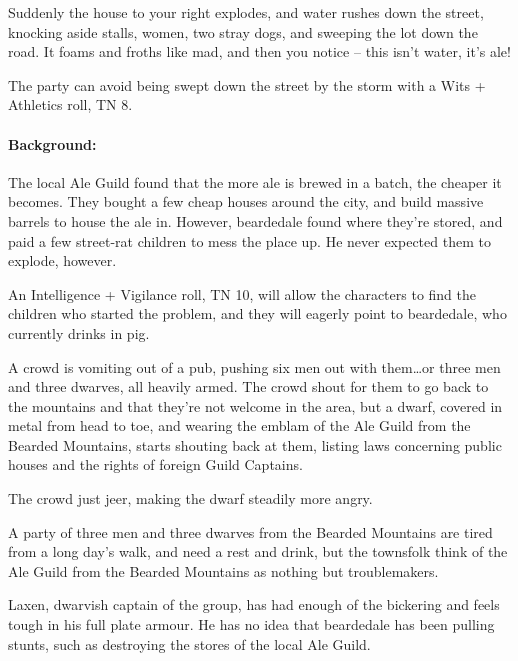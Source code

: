 \begin{multicols}{2}
\begin{boxtext}
	Suddenly the house to your right explodes, and water rushes down the street, knocking aside stalls, women, two stray dogs, and sweeping the lot down the road.  It foams and froths like mad, and then you notice -- this isn't water, it's ale!
\end{boxtext}

The party can avoid being swept down the street by the storm with a Wits + Athletics roll, TN 8.

\paragraph{Background:} The local Ale Guild found that the more ale is brewed in a batch, the cheaper it becomes.  They bought a few cheap houses around the city, and build massive barrels to house the ale in.  However, \gls{beardedale} found where they're stored, and paid a few street-rat children to mess the place up.  He never expected them to explode, however.

An Intelligence + Vigilance roll, TN 10, will allow the characters to find the children who started the problem, and they will eagerly point to \gls{beardedale}, who currently drinks in \gls{pig}.



\begin{boxtext}
	A crowd is vomiting out of a pub, pushing six men out with them\ldots or three men and three dwarves, all heavily armed.  The crowd shout for them to go back to the mountains and that they're not welcome in the area, but a dwarf, covered in metal from head to toe, and wearing the emblam of the Ale Guild from the Bearded Mountains, starts shouting back at them, listing laws concerning public houses and the rights of foreign Guild Captains.

	The crowd just jeer, making the dwarf steadily more angry.
\end{boxtext}

A party of three men and three dwarves from the Bearded Mountains are tired from a long day's walk, and need a rest and drink, but the townsfolk think of the Ale Guild from the Bearded Mountains as nothing but troublemakers.

Laxen, dwarvish captain of the group, has had enough of the bickering and feels tough in his full plate armour.  He has no idea that \gls{beardedale} has been pulling stunts, such as destroying the stores of the local Ale Guild.


\end{multicols}

